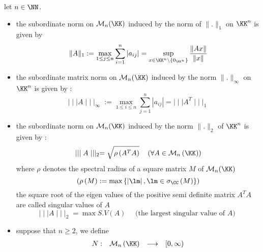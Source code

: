 \begin{example}
let $n \in \NN$. 
\begin{itemize}
	\item the subordinate norm on $\mathcal{M}_{n}(\KK)  $ induced
		by the norm of $\| . \| _{1}$  on $\KK^n $  is given by 
		\[
		\| A \| _{1} :=
		\max _{1 \leq j \leq n} 
		\sum_{i=1}^{n} 
		\left| a_{ij} \right| = 
		\sup_{x \in \KK^n  \backslash \left\{ 0_{\KK^n } \right\}}  
		\frac{\| Ax \| }{\| x \| }
		\]
	\item the subordinate matrix norm on $\mathcal{M}_{n}(\KK)  $ induced by
		the norm $\| . \|_{\infty } $  on $\KK^n $ is given by : 
		\[
		\mid \mid \mid  A \mid \mid \mid_{\infty }  := 
		\max_{ 1 \leq i \leq n} \sum_{j=1}^{n} 
		 \left| a_{ij} \right| = 
		 \mid \mid \mid  A^{T} \mid \mid \mid _{1}
		\]
	\item the subordinate norm on $\mathcal{M}_{n}(\KK)  $   
		induced by the norm $\| . \|_{2} $  
		of $\KK^n $ is given by : 
		\[
		\mid \mid \mid  A \mid \mid \mid_{2}  = 
		\sqrt{\rho \left( A^{T}A \right)}  \quad 
		\left( \forall A \in \mathcal{M}_{n}\left( \KK \right)  \right)
		\]
		where $\rho$ denotes the spectral radius of a square matrix $M$
		of $\mathcal{M}_{n}(\KK)  $ 
		\[
		\left( \rho \left( M \right) :=  
			\max \left\{ 
				\left| \lm \right|, \lm
				\in  \sigma _{\CC }   \left( M \right)
			\right\}
		\right)
		\]
		the square root of the eigen values of the positive semi definite
		matrix $A^{T}A$  are called singular values of $A$
		\[
		\mid \mid \mid  A \mid \mid \mid _{2} = 
		\max S.V \left( A \right) \quad 
		\text{ (the largest singular value of $A$) } 
		\]
	\item suppose that $n \geq 2$, we define 
		\[
		\begin{array}{cccc}
			N : &  \mathcal{M} _{n}\left( \KK \right)  & \longrightarrow & [0,\infty ) \\
		

\end{array}\]
\end{itemize}
\end{example}
